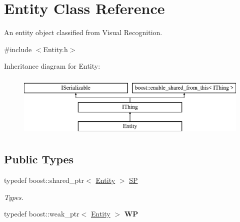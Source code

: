 \hypertarget{class_entity}{}\section{Entity Class Reference}
\label{class_entity}


An entity object classified from Visual Recognition.  




{\ttfamily \#include $<$Entity.\+h$>$}

Inheritance diagram for Entity\+:\begin{figure}[H]
\begin{center}
\leavevmode
\includegraphics[height=3.000000cm]{class_entity}
\end{center}
\end{figure}
\subsection*{Public Types}
\begin{DoxyCompactItemize}
\item 
\mbox{\label{class_entity_a7ec71d8cbb17276eb23575040bfbd481}} 
typedef boost\+::shared\+\_\+ptr$<$ \hyperlink{class_entity}{Entity} $>$ \hyperlink{class_entity_a7ec71d8cbb17276eb23575040bfbd481}{SP}
\begin{DoxyCompactList}\small\item\em Types. \end{DoxyCompactList}\item 
\mbox{\label{class_entity_a4cfc4e9d54917f65c04bcaa915d458df}} 
typedef boost\+::weak\+\_\+ptr$<$ \hyperlink{class_entity}{Entity} $>$ {\bfseries WP}
\end{DoxyCompactItemize}
